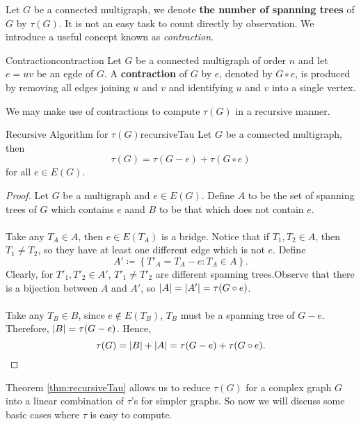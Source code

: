 \documentclass[math]{amznotes}
\theoremstyle{remark}
\begin{document}
Let $G$ be a connected multigraph, we denote \textbf{the number of spanning trees} of $G$ by $\tau(G)$. It is not an easy task to count directly by observation. We introduce a useful concept known as \textit{contraction}.
\begin{dfnbox}{Contraction}{contraction}
    Let $G$ be a connected multigraph of order $n$ and let $e = uv$ be an egde of $G$. A {\color{red} \textbf{contraction}} of $G$ by $e$, denoted by $G \circ e$, is produced by removing all edges joining $u$ and $v$ and identifying $u$ and $v$ into a single vertex.
\end{dfnbox}
We may make use of contractions to compute $\tau(G)$ in a recursive manner.
\begin{thmbox}{Recursive Algorithm for $\tau(G)$}{recursiveTau}
    Let $G$ be a connected multigraph, then
    \begin{equation*}
        \tau(G) = \tau(G - e) + \tau(G \circ e)
    \end{equation*}
    for all $e \in E(G)$.
    \tcblower
    \begin{proof}
        Let $G$ be a multigraph and $e \in E(G)$. Define $A$ to be the set of spanning trees of $G$ which contains $e$ aand $B$ to be that which does not contain $e$.
        \\\\
        Take any $T_A \in A$, then $e \in E(T_A)$ is a bridge. Notice that if $T_1, T_2 \in A$, then $T_1 \neq T_2$, so they have at least one different edge which is not $e$. Define
        \begin{equation*}
            A' \coloneqq \left\{T'_A = T_A - e \colon T_A \in A\right\}.
        \end{equation*}
        Clearly, for $T'_1, T'_2 \in A'$, $T'_1 \neq T'_2$ are different spanning trees.Observe that there is a bijection between $A$ and $A'$, so ${\left\lvert {A} \right\rvert} = {\left\lvert {A'} \right\rvert} = \tau(G \circ e)$.
        \\\\
        Take any $T_B \in B$, since $e \notin E(T_B)$, $T_B$ must be a spanning tree of $G - e$. Therefore, ${\left\lvert {B} \right\rvert} = \tau(G - e)$. Hence,
        \begin{equation*}
            \tau(G) = {\left\lvert {B} \right\rvert} + {\left\lvert {A} \right\rvert} = \tau(G - e) + \tau(G \circ e).
        \end{equation*}
    \end{proof}
\end{thmbox}
Theorem \ref{thm:recursiveTau} allows us to reduce $\tau(G)$ for a complex graph $G$ into a linear combination of $\tau$'s for simpler graphs. So now we will discuss some basic cases where $\tau$ is easy to compute.
\end{document}
